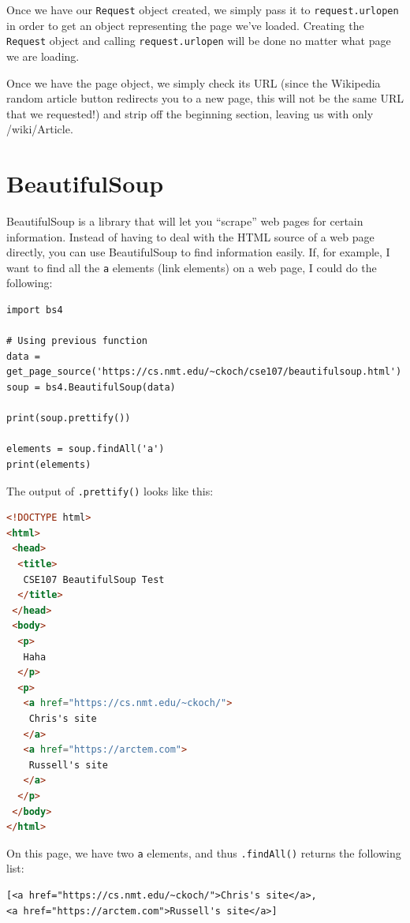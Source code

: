 \documentclass[11pt]{cselabheader}
\begin{document}
Once we have our \lstinline{Request} object created, we simply pass it to
\lstinline{request.urlopen} in order to get an object representing the page
we've loaded. Creating the \lstinline{Request} object and calling
\lstinline{request.urlopen} will be done no matter what page we are loading.

Once we have the page object, we simply check its URL (since the Wikipedia
random article button redirects you to a new page, this will not be the
same URL that we requested!) and strip off the beginning section, leaving
us with only /wiki/Article.

\pagebreak
\section{BeautifulSoup}
BeautifulSoup is a library that will let you ``scrape'' web pages for certain
information. Instead of having to deal with the HTML source of a web page
directly, you can use BeautifulSoup to find information easily.
If, for example, I want to find all the \texttt{a} elements (link
elements) on a web page, I could do the following:

\begin{lstlisting}[caption={BeautifulSoup},label={lst:bs}]
import bs4

# Using previous function
data = get_page_source('https://cs.nmt.edu/~ckoch/cse107/beautifulsoup.html')
soup = bs4.BeautifulSoup(data)

print(soup.prettify())

elements = soup.findAll('a')
print(elements)
\end{lstlisting}

The output of \lstinline!.prettify()! looks like this:
\begin{lstlisting}[language=HTML]
<!DOCTYPE html>
<html>
 <head>
  <title>
   CSE107 BeautifulSoup Test
  </title>
 </head>
 <body>
  <p>
   Haha
  </p>
  <p>
   <a href="https://cs.nmt.edu/~ckoch/">
    Chris's site
   </a>
   <a href="https://arctem.com">
    Russell's site
   </a>
  </p>
 </body>
</html>
\end{lstlisting}

On this page, we have two \texttt{a} elements, and thus
\lstinline!.findAll()! returns the following list:
\begin{lstlisting}[style=bash]
[<a href="https://cs.nmt.edu/~ckoch/">Chris's site</a>,
<a href="https://arctem.com">Russell's site</a>]
\end{lstlisting}
\end{document}
